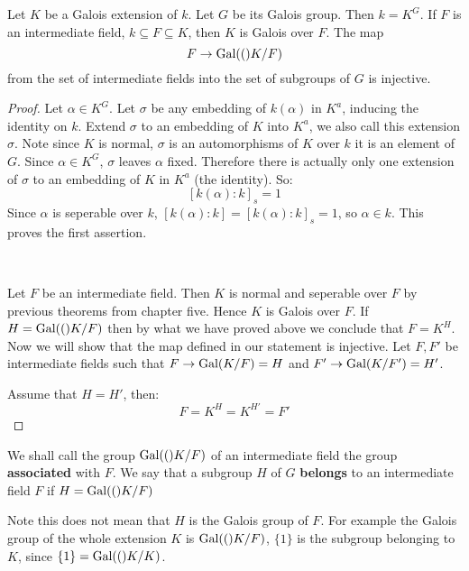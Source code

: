 \begin{theorem}\label{1.2}
    Let $K$ be a Galois extension of $k$. Let $G$ be its Galois group. Then $k=K^G$. If $F$ is an intermediate field, $k\subseteq F\subseteq K$, then $K$ is Galois over $F$. The map\[F\rightarrow \text{Gal}(()K/F)\]from the set of intermediate fields into the set of subgroups of $G$ is injective.

    \begin{proof}
        Let $\alpha\in K^G$. Let $\sigma$ be any embedding of $k(\alpha)$ in $K^a$, inducing the identity on $k$. Extend $\sigma$ to an embedding of $K$ into $K^a$, we also call this extension $\sigma$. Note since $K$ is normal, $\sigma$ is an automorphisms of $K$ over $k$ it is an element of $G$. Since $\alpha\in K^G$, $\sigma$ leaves $\alpha$ fixed. Therefore there is actually only one extension of $\sigma$ to an embedding of $K$ in $K^a$ (the identity). So:\[{[k(\alpha)\colon k]}_s = 1 \] 
        Since $\alpha$ is seperable over $k$, $[k(\alpha)\colon k] = {[k(\alpha)\colon k]}_s = 1$, so $\alpha\in k$. This proves the first assertion.

        \

        Let $F$ be an intermediate field. Then $K$ is normal and seperable over $F$ by previous theorems from chapter five. Hence $K$ is Galois over $F$. If $H = \text{Gal}(()K/F)$ then by what we have proved above we conclude that $F = K^H$. Now we will show that the map defined in our statement is injective. Let $F,F'$ be intermediate fields such that $F\rightarrow \text{Gal}(K/F) = H$ and $F'\rightarrow \text{Gal}(K/F') = H'$.

        Assume that $H=H'$, then:\begin{equation*}
            F = K^H = K^{H'} = F'
        \end{equation*}
    \end{proof}
\end{theorem} 
    \begin{definition}
        We shall call the group $\text{Gal}((){K/F})$ of an intermediate field the group \textbf{associated} with $F$. We say that a subgroup $H$ of $G$ \textbf{belongs} to an intermediate field $F$ if $H = \text{Gal}((){K/F})$
       \begin{bergman}
        Note this does not mean that $H$ is the Galois group of $F$. For example the Galois group of the whole extension $K$ is $\text{Gal}(()K/F)$, $\{1\}$ is the subgroup belonging to $K$, since $\{1\} = \text{Gal}(()K/K)$.
    \end{bergman}
    \end{definition}

